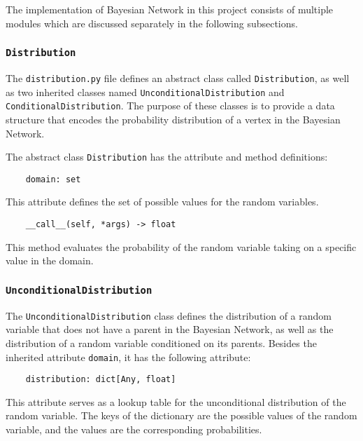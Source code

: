 \documentclass{article}
\theoremstyle{definition}
\begin{document}
The implementation of Bayesian Network in this project consists of multiple modules which are discussed separately in the following subsections.

\subsubsection{\texttt{Distribution}}

The \texttt{distribution.py} file defines an abstract class called \texttt{Distribution}, as well as two inherited classes named \texttt{UnconditionalDistribution} and \texttt{ConditionalDistribution}. The purpose of these classes is to provide a data structure that encodes the probability distribution of a vertex in the Bayesian Network.

The abstract class \texttt{Distribution} has the attribute and method definitions:

\begin{verbatim}
    domain: set
\end{verbatim}

This attribute defines the set of possible values for the random variables.

\begin{verbatim}
    __call__(self, *args) -> float
\end{verbatim}

This method evaluates the probability of the random variable taking on a specific value in the domain.

\subsubsection{\texttt{UnconditionalDistribution}}

The \texttt{UnconditionalDistribution} class defines the distribution of a random variable that does not have a parent in the Bayesian Network, as well as the distribution of a random variable conditioned on its parents. Besides the inherited attribute \texttt{domain}, it has the following attribute:

\begin{verbatim}
    distribution: dict[Any, float]
\end{verbatim}

This attribute serves as a lookup table for the unconditional distribution of the random variable. The keys of the dictionary are the possible values of the random variable, and the values are the corresponding probabilities.
\end{document}
